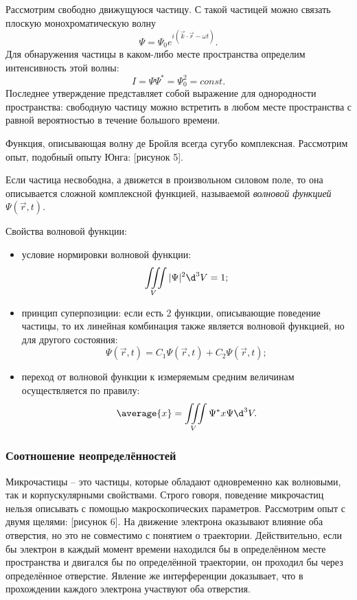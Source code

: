 Рассмотрим свободно движущуюся частицу. С такой частицей можно связать плоскую
монохроматическую волну
\[
    \Psi = \Psi_0 e^{i(\vec{k}\cdot\vec{r} - \omega t)}.
\]
Для обнаружения частицы в каком-либо месте пространства определим интенсивность
этой волны:
\[
    I = \Psi\Psi^* = \Psi_0^2 = const.
\]
Последнее утверждение представляет собой выражение для однородности
пространства: свободную частицу можно встретить в любом месте пространства с
равной вероятностью в течение большого времени.

Функция, описывающая волну де Бройля всегда сугубо комплексная. Рассмотрим опыт,
подобный опыту Юнга: [рисунок 5].

Если частица несвободна, а движется в произвольном силовом поле, то она
описывается сложной комплексной функцией, называемой \emph{волновой функцией}
\( \Psi(\vec{r}, t) \).

Свойства волновой функции:
\begin{itemize}
    \item условие нормировки волновой функции:
        \[
            \iiint\limits_V |\Psi|^2 \d^3 V = 1;
        \]
    \item принцип суперпозиции: если есть 2 функции, описывающие поведение
        частицы, то их линейная комбинация также  является волновой функцией,
        но для другого состояния:
    \[
        \Psi(\vec{r}, t) = C_1\Psi(\vec{r}, t) + C_2\Psi(\vec{r}, t);
    \]
    \item переход от волновой функции к измеряемым средним величинам
        осуществляется по правилу:
    \[
        \average{x} = \iiint\limits_V \Psi^* x \Psi \d^3 V.
    \]
\end{itemize}

\subsubsection{Соотношение неопределённостей}
Микрочастицы -- это частицы, которые обладают одновременно как волновыми, так и
корпускулярными свойствами. Строго говоря, поведение микрочастиц нельзя
описывать с помощью макроскопических параметров. Рассмотрим опыт с двумя щелями:
[рисунок 6]. На движение электрона оказывают влияние оба отверстия, но это не
совместимо с понятием о траектории. Действительно, если бы электрон в каждый
момент времени находился бы в определённом месте пространства и двигался бы по
определённой траектории, он проходил бы через определённое отверстие. Явление же
интерференции доказывает, что в прохождении каждого электрона участвуют оба
отверстия.

